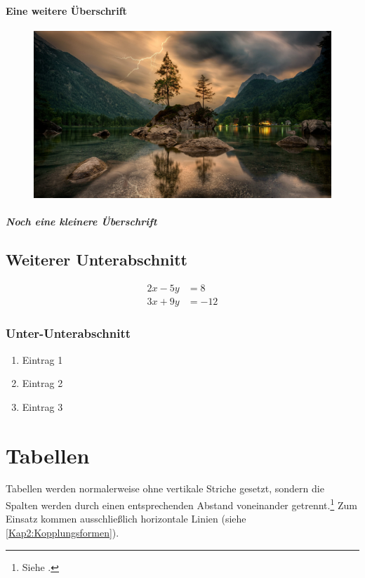 	\blindtext[5]
	
	\paragraph{Eine weitere Überschrift}
	
	\begin{figure}
		\centering
		\includegraphics[width=0.7\linewidth]{bilder/nature}
		\caption{}
		\label{fig:nature}
	\end{figure}
	
	
	\subparagraph{Noch eine kleinere Überschrift}
	
	\subsection{Weiterer Unterabschnitt}
	
	\begin{align*} 
		2x - 5y &=  8 \\ 
		3x + 9y &=  -12
	\end{align*}
	
	\subsubsection{Unter-Unterabschnitt}
	
	
	\begin{enumerate}
		\item Eintrag 1
		\item Eintrag 2
		\item Eintrag 3
	\end{enumerate}
	
	\section{Tabellen}
	
	Tabellen werden normalerweise ohne vertikale Striche gesetzt, sondern die Spalten werden durch einen entsprechenden Abstand voneinander getrennt.\footnote{Siehe \cite[S. 89]{Willberg2021}.} Zum Einsatz kommen ausschließlich horizontale Linien (siehe \autoref{Kap2:Kopplungsformen}).
	

